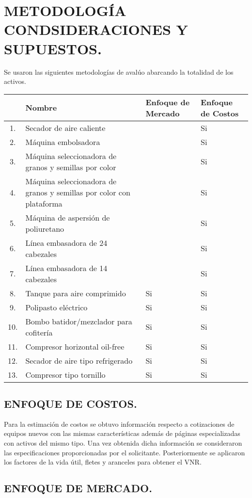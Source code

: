 
\chapter{METODOLOGÍA CONDSIDERACIONES Y SUPUESTOS.} %

Se usaron las siguientes metodologías de avalúo abarcando la totalidad de los
activos.

\begin{tabular}{|cp{7cm}|p{2cm}|p{2cm}|}
	\hline 
	& Nombre & Enfoque de Mercado & Enfoque de Costos \\ \hline 
	1. & Secador de aire caliente & & Si \\ \hline
	2. & Máquina embolsadora & & Si \\ \hline
	3. & Máquina seleccionadora de granos y semillas por color & & Si \\ \hline
	4. & Máquina seleccionadora de granos y semillas por color con plataforma & & Si \\ \hline
	5. & Máquina de aspersión de poliuretano & & Si \\ \hline
	6. & Línea embasadora de 24 cabezales & & Si \\ \hline
	7. & Línea embasadora de 14 cabezales & & Si \\ \hline
	8. & Tanque para aire comprimido & Si & Si \\ \hline
	9. & Polipasto eléctrico & Si & Si \\ \hline
	10. & Bombo batidor/mezclador para cofitería & Si & Si \\ \hline
	11. & Compresor horizontal oil-free & Si & Si \\ \hline
	12. & Secador de aire tipo refrigerado & Si & Si \\ \hline
	13. & Compresor tipo tornillo & Si & Si \\ \hline
\end{tabular}

\section{ENFOQUE DE COSTOS.} %
Para la estimación de costos se  obtuvo información  respecto a cotizaciones de equipos nuevos con las mismas características además de páginas especializadas con activos del mismo tipo. Una vez obtenida  dicha información se consideraron las especificaciones proporcionadas por el solicitante.
Posteriormente se aplicaron los factores de la vida útil, fletes y aranceles para obtener el VNR.

\section{ENFOQUE DE MERCADO.} %

